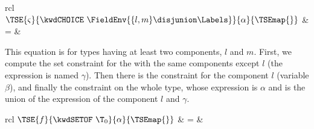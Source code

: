 \noindent
\begin{tabular}{rcl}
     $\TSE{\varsigma}{\kwdCHOICE \,\, \FieldEnv{\{l,m\} \disjunion
      \Labels}}{\alpha}{\TSEmap{}}$
   & \hspace*{-4mm} = & \\
\end{tabular}

\medskip

This equation is for \kwdCHOICE{} types having at least two
components, $l$ and $m$. First, we compute the set constraint for the
\kwdCHOICE{} with the same components except $l$ (the expression is
named $\gamma$). Then there is the constraint for the component $l$
(variable $\beta$), and finally the constraint on the whole
\kwdCHOICE{} type, whose expression is $\alpha$ and is the 
union of the expression of the component $l$ and $\gamma$.

\medskip

\noindent
\begin{tabular}{rcl}
    $\TSE{f}{\kwdSETOF \,\, \T_0}{\alpha}{\TSEmap{}}$
  & \hspace*{-4mm} = & \\
\end{tabular}
\medskip

